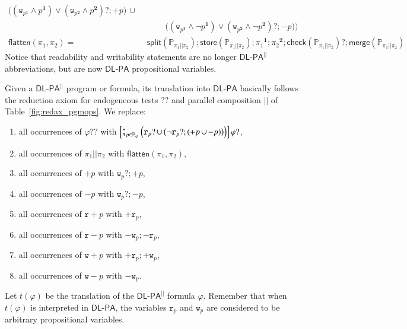 \documentclass{llncs}
\newcommand{\progStore}{\mathsf{store}}
\newcommand{\progOkChange}{\mathsf{check}}
\newcommand{\progsplit}{\mathsf{split}}
\newcommand{\progmerge}{\mathsf{merge}}
\newcommand{\progFlatten}{\mathsf{flatten}}
\newcommand{\cp}[2]{{#2}^\mathbf{#1}}
\newcommand{\pll}{ {||} }							%
\newcommand{\readable}[1]{\mathtt{r}_{#1}}
\newcommand{\writable}[1]{\mathtt{w}_{#1}}
\newcommand{\testendo}{?\!\!?}			%
\newcommand{\testpdl}{?}				%
\newcommand{\Dlpa}{\ensuremath{\mathsf{DL\text{-}PA}}\xspace}
\newcommand{\DlpaPll}{\ensuremath{\mathsf{DL\text{-}PA}^\pll}\xspace}
\newcommand{\assgntop}[1]{{\mathtt {+} #1}}
\newcommand{\assgnbot}[1]{{\mathtt {-} #1}}
\newcommand{\assgntopR}[1]{{\mathtt r {+} #1}}
\newcommand{\assgnbotR}[1]{{\mathtt r {-} #1}}
\newcommand{\assgntopW}[1]{{\mathtt w {+} #1}}
\newcommand{\assgnbotW}[1]{{\mathtt w {-} #1}}
\newcommand{\assgntopV}[1]{{\mathtt {+} #1}}
\newcommand{\assgnbotV}[1]{{\mathtt {-} #1}}
\newcommand{\ndet}{\,{\cup}\,}
\renewcommand{\phi}{\varphi}
\newcommand{\propset}{\mathbb P}
\newcommand{\propsetOf}[1]{\propset_{#1}}
\newcommand{\seqseq}[1]{ \text{\Large ;}_{#1} ~ }
\begin{document}
\begin{align*}
\big(	(\writable{ \cp{1}{p} } \land \cp{1}{p}) \lor 
		(\writable{ \cp{2}{p} } \land \cp{2}{p}) \testpdl ; \assgntopV p \big) \ndet 
\\& ~~~~~~~~~~~ 
\big(	(\writable{ \cp{1}{p} } \land \lnot \cp{1}{p}) \lor 
		(\writable{ \cp{2}{p} } \land \lnot \cp{2}{p}) \testpdl ; \assgnbotV p \big)
\Big)
\\ %
\progFlatten(\pi_1, \pi_2) =&\ %
  \progsplit\left(\propsetOf{\pi_1 \pll \pi_2}\right) ;
  \progStore\left(\propsetOf{\pi_1 \pll \pi_2}\right) ;
  \cp 1 {\pi_1} ; \cp 2 {\pi_2} ;
  \progOkChange\left(\propsetOf{\pi_1 \pll \pi_2}\right) \testpdl ;
  \progmerge\left(\propsetOf{\pi_1 \pll \pi_2}\right)
\end{align*}
Notice that
readability and writability statements are no longer \DlpaPll abbreviations, but are now \Dlpa propositional variables. 

Given a \DlpaPll program or formula, its translation into \Dlpa basically follows the reduction axiom for endogeneous tests $\testendo$ and parallel composition $ \pll $ of Table~\ref{fig:redax_pgmops}. 
We replace:
\begin{enumerate}
\item
all occurrences of $\phi \testendo $ with 
$\left[\seqseq{p \in \propsetOf \phi} \Big(
\readable{p} \testpdl \ndet \big( \lnot \readable{p} \testpdl ; (\assgntopV{p} \ndet \assgnbotV{p}) \big) 
\Big)\right] \phi \testpdl $,
\item
all occurrences of $ \pi_1 \pll \pi_2 $ with $\progFlatten(\pi_1, \pi_2)$,
\item
all occurrences of $\assgntopV p$ with $\writable p ? ; \assgntopV p$,
\item
all occurrences of $\assgnbotV p$ with $\writable p ? ; \assgnbotV p$,
\item
all occurrences of $\assgntopR{p}$ with $\assgntop{ \readable{p}}$,
\item
all occurrences of $\assgnbotR{p}$ with $\assgnbot{ \writable{p}} ; \assgnbot{ \readable{p}}$,
\item
all occurrences of $\assgntopW{p}$ with $\assgntop{ \readable{p}} ; \assgntop{ \writable{p}}$,
\item
all occurrences of $\assgnbotW{p}$ with $\assgnbot{ \writable{p}}$.
\end{enumerate}
Let %
$t(\phi)$ be the translation of the \DlpaPll formula $\phi$.
Remember that when $t(\phi)$ is interpreted in \Dlpa, the variables $\readable p$ and $\writable{p}$ 
are considered to be arbitrary propositional variables. 
\end{document}
